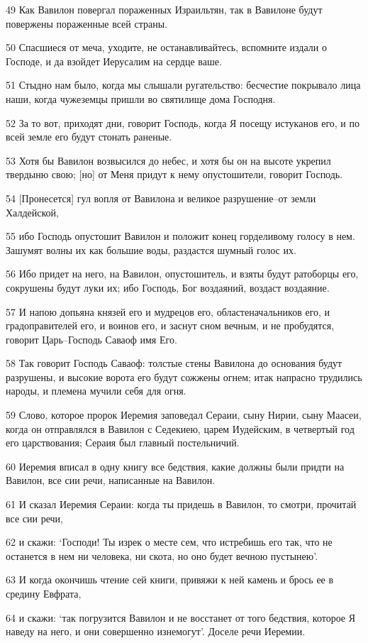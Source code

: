 \par 49 Как Вавилон повергал пораженных Израильтян, так в Вавилоне будут повержены пораженные всей страны.
\par 50 Спасшиеся от меча, уходите, не останавливайтесь, вспомните издали о Господе, и да взойдет Иерусалим на сердце ваше.
\par 51 Стыдно нам было, когда мы слышали ругательство: бесчестие покрывало лица наши, когда чужеземцы пришли во святилище дома Господня.
\par 52 За то вот, приходят дни, говорит Господь, когда Я посещу истуканов его, и по всей земле его будут стонать раненые.
\par 53 Хотя бы Вавилон возвысился до небес, и хотя бы он на высоте укрепил твердыню свою; [но] от Меня придут к нему опустошители, говорит Господь.
\par 54 [Пронесется] гул вопля от Вавилона и великое разрушение--от земли Халдейской,
\par 55 ибо Господь опустошит Вавилон и положит конец горделивому голосу в нем. Зашумят волны их как большие воды, раздастся шумный голос их.
\par 56 Ибо придет на него, на Вавилон, опустошитель, и взяты будут ратоборцы его, сокрушены будут луки их; ибо Господь, Бог воздаяний, воздаст воздаяние.
\par 57 И напою допьяна князей его и мудрецов его, областеначальников его, и градоправителей его, и воинов его, и заснут сном вечным, и не пробудятся, говорит Царь--Господь Саваоф имя Его.
\par 58 Так говорит Господь Саваоф: толстые стены Вавилона до основания будут разрушены, и высокие ворота его будут сожжены огнем; итак напрасно трудились народы, и племена мучили себя для огня.
\par 59 Слово, которое пророк Иеремия заповедал Сераии, сыну Нирии, сыну Маасеи, когда он отправлялся в Вавилон с Седекиею, царем Иудейским, в четвертый год его царствования; Сераия был главный постельничий.
\par 60 Иеремия вписал в одну книгу все бедствия, какие должны были придти на Вавилон, все сии речи, написанные на Вавилон.
\par 61 И сказал Иеремия Сераии: когда ты придешь в Вавилон, то смотри, прочитай все сии речи,
\par 62 и скажи: `Господи! Ты изрек о месте сем, что истребишь его так, что не останется в нем ни человека, ни скота, но оно будет вечною пустынею'.
\par 63 И когда окончишь чтение сей книги, привяжи к ней камень и брось ее в средину Евфрата,
\par 64 и скажи: `так погрузится Вавилон и не восстанет от того бедствия, которое Я наведу на него, и они совершенно изнемогут'. Доселе речи Иеремии.

